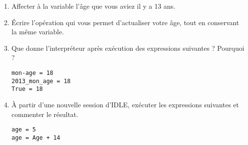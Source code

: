\question{}
\begin{enumerate}[label = \emph{\alph*)}]
  \item Affecter à la variable   l'âge que vous aviez il y a 13 ans.
  \item \'Ecrire l'opération qui vous permet d'actualiser votre âge, tout en conservant la même variable.
  \item Que donne l'interpréteur après exécution des expressions suivantes ? Pourquoi ? 
\begin{lstlisting}
mon-age = 18
2013_mon_age = 18
True = 18
\end{lstlisting}
  \item \`A partir d'une nouvelle session d'IDLE, exécuter les expressions suivantes et commenter le résultat.
\begin{lstlisting}
age = 5
age = Age + 14
\end{lstlisting}
\end{enumerate}
